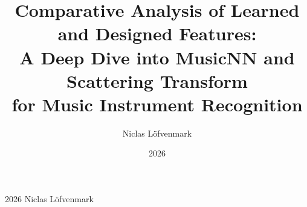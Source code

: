 \documentclass[12pt,a4paper]{report}
\title{
  \textbf{Comparative Analysis of Learned and Designed Features:}\\[0.5em]
  \Large A Deep Dive into MusicNN and Scattering Transform\\
  for Music Instrument Recognition
}
\author{Niclas L\"{o}fvenmark}
\date{2026}
\begin{document}


\thispagestyle{empty}
\vspace*{\fill}
\begin{center}
  \textcopyright{} 2026 Niclas L\"{o}fvenmark
\end{center}
\vspace*{\fill}
\clearpage







\tableofcontents
\clearpage












\begin{appendices}

\end{appendices}
\end{document}

